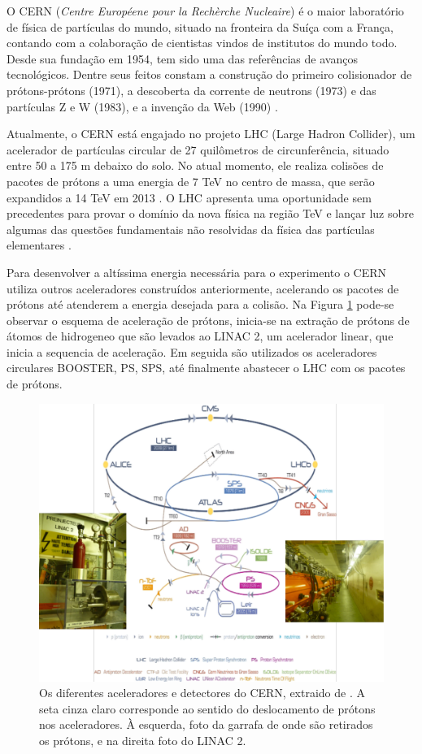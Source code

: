 O CERN ({\it Centre Européene pour la Rechèrche Nucleaire}) é o maior
laboratório de física de partículas do mundo, situado na fronteira da Suíça com
a França, contando com a colaboração de cientistas vindos de institutos
do mundo todo. Desde sua fundação em 1954, tem sido uma das referências de
avanços tecnológicos. Dentre seus feitos constam a construção do primeiro 
colisionador de prótons-prótons (1971), a descoberta 
da corrente de neutrons (1973) e das partículas Z e W (1983), 
e a invenção da Web (1990) \cite{webCERN}.

Atualmente, o CERN está engajado no projeto LHC (Large Hadron
Collider), um acelerador de partículas circular de 27 quilômetros de
circunferência, situado entre 50 a 175 m debaixo do solo. 
No atual momento, ele realiza colisões de pacotes de prótons a uma energia
de 7 TeV no centro de massa, que serão expandidos a 14 TeV em 2013 \cite{webATLAS}.
O LHC apresenta uma oportunidade sem precedentes para provar o domínio da
nova física na região TeV e lançar luz sobre algumas das questões fundamentais
não resolvidas da física das partículas elementares \cite{hunt_for_physics}. 

Para desenvolver a altíssima energia necessária para o experimento o CERN 
utiliza outros aceleradores construídos anteriormente, acelerando os pacotes de prótons até atenderem
a energia desejada para a colisão. Na Figura \ref{fig:esquema_aceleradores} pode-se observar
o esquema de aceleração de prótons, inicia-se na extração de prótons de átomos
de hidrogeneo que são levados ao LINAC 2, um acelerador linear,
que inicia a sequencia de aceleração. Em seguida são utilizados os aceleradores
circulares BOOSTER, PS, SPS, até finalmente abastecer o LHC com os pacotes de
prótons.

\begin{figure}[h!t]
\centering
\includegraphics[width=\textwidth]{imagens/lhc_garrafa_linac2.pdf}
\caption{Os diferentes aceleradores e detectores do CERN, extraido de
\cite{cern_accelerators}. A seta cinza claro corresponde ao sentido do
deslocamento de prótons nos aceleradores. À esquerda, foto da garrafa
de onde são retirados os prótons, e na direita foto do LINAC 2.}
\label{fig:esquema_aceleradores}
\end{figure}


